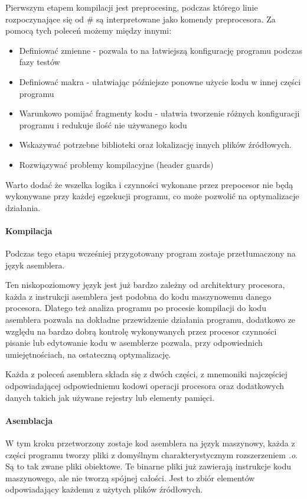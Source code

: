 Pierwszym etapem kompilacji jest preprocesing, podczas którego linie rozpoczynające się od \# są interpretowane jako komendy preprocesora.  
Za pomocą tych poleceń możemy między innymi:
\begin{itemize}
        \item Definiować zmienne - pozwala to na łatwiejszą konfigurację programu podczas fazy testów
        \item Definiować makra - ułatwiając późniejsze ponowne użycie kodu w innej części programu
        \item Warunkowo pomijać fragmenty kodu - ułatwia tworzenie różnych konfiguracji programu i redukuje ilość nie używanego kodu
        \item Wskazywać potrzebne biblioteki oraz lokalizację innych plików źródłowych.
        \item Rozwiązywać problemy kompilacyjne (header guards)
\end{itemize}
Warto dodać że wszelka logika i czynności wykonane przez prepocesor nie będą wykonywane przy każdej egzekucji programu, co może pozwolić na optymalizacje działania. 

\paragraph{Kompilacja}

Podczas tego etapu wcześniej przygotowany program zostaje przetłumaczony na język asemblera. 

Ten niskopoziomowy język jest już bardzo zależny od architektury procesora, każda z  instrukcji asemblera jest podobna do kodu maszynowemu danego procesora. 
Dlatego też analiza programu po procesie kompilacji do kodu asemblera pozwala na dokładne przewidzenie działania programu, dodatkowo
ze względu na bardzo dobrą kontrolę wykonywanych przez procesor czynności pisanie lub edytowanie kodu w asemblerze pozwala, przy odpowiednich umiejętnościach, na ostateczną optymalizację. 

Każda z poleceń asemblera składa się z dwóch części, z mnemoniki najczęściej odpowiadającej odpowiedniemu kodowi operacji procesora oraz dodatkowych danych takich jak używane rejestry lub elementy pamięci. 

\paragraph{Asemblacja}

W tym kroku przetworzony zostaje kod asemblera na język maszynowy, każda z części programu tworzy pliki z domyślnym charakterystycznym rozszerzeniem \textit{.o}.
Są to tak zwane pliki obiektowe.
Te binarne pliki już zawierają instrukcje kodu maszynowego, ale nie tworzą spójnej całości. Jest to zbiór elementów odpowiadający każdemu z użytych plików źródłowych.


